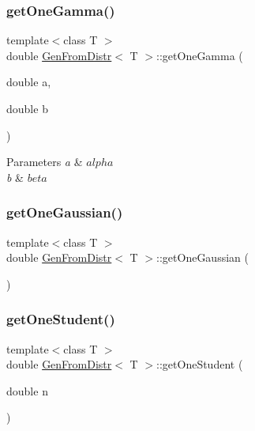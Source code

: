 \subsubsection{\texorpdfstring{get\+One\+Gamma()}{getOneGamma()}}
{\footnotesize\ttfamily template$<$class T $>$ \\
double \hyperlink{classGenFromDistr}{Gen\+From\+Distr}$<$ T $>$\+::get\+One\+Gamma (\begin{DoxyParamCaption}\item[{double}]{a,  }\item[{double}]{b }\end{DoxyParamCaption})\hspace{0.3cm}{\ttfamily [inline]}}


\begin{DoxyParams}{Parameters}
{\em a} & $alpha$ \\
\hline
{\em b} & $beta$ \\
\hline
\end{DoxyParams}
\hypertarget{classGenFromDistr_aba586e9d1c4d07a30d622e7f16fc13e4}{}\label{classGenFromDistr_aba586e9d1c4d07a30d622e7f16fc13e4} 
\subsubsection{\texorpdfstring{get\+One\+Gaussian()}{getOneGaussian()}}
{\footnotesize\ttfamily template$<$class T $>$ \\
double \hyperlink{classGenFromDistr}{Gen\+From\+Distr}$<$ T $>$\+::get\+One\+Gaussian (\begin{DoxyParamCaption}{ }\end{DoxyParamCaption})\hspace{0.3cm}{\ttfamily [inline]}}

\hypertarget{classGenFromDistr_a7de451b0e96024d6c5216c57a226de76}{}\label{classGenFromDistr_a7de451b0e96024d6c5216c57a226de76} 
\subsubsection{\texorpdfstring{get\+One\+Student()}{getOneStudent()}}
{\footnotesize\ttfamily template$<$class T $>$ \\
double \hyperlink{classGenFromDistr}{Gen\+From\+Distr}$<$ T $>$\+::get\+One\+Student (\begin{DoxyParamCaption}\item[{double}]{n }\end{DoxyParamCaption})\hspace{0.3cm}{\ttfamily [inline]}}


